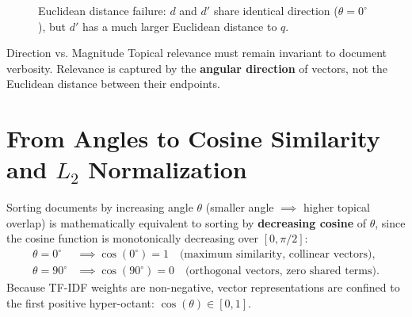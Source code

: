 \begin{figure}[H]
\centering
{}
\caption{Euclidean distance failure: $d$ and $d'$ share identical direction ($\theta = 0^\circ$), but $d'$ has a much larger Euclidean distance to $q$.}
\label{fig:vsm-euclidean-failure-en}
\end{figure}

\begin{noteblock}{Direction vs. Magnitude}
Topical relevance must remain invariant to document verbosity. Relevance is captured by the \textbf{angular direction} of vectors, not the Euclidean distance between their endpoints.
\end{noteblock}

\FloatBarrier
\section[From Angles to Cosine Similarity and L2 Normalization]{From Angles to Cosine Similarity and $L_2$ Normalization}
\label{sec:cosine-similarity-l2-en}

Sorting documents by increasing angle $\theta$ (smaller angle $\implies$ higher topical overlap) is mathematically equivalent to sorting by \textbf{decreasing cosine} of $\theta$, since the cosine function is monotonically decreasing over $[0, \pi/2]$:
\begin{align}
\theta = 0^\circ &\implies \cos(0^\circ) = 1 \quad \text{(maximum similarity, collinear vectors)}, \\
\theta = 90^\circ &\implies \cos(90^\circ) = 0 \quad \text{(orthogonal vectors, zero shared terms)}.
\end{align}
Because TF-IDF weights are non-negative, vector representations are confined to the first positive hyper-octant: $\cos(\theta) \in [0, 1]$.

